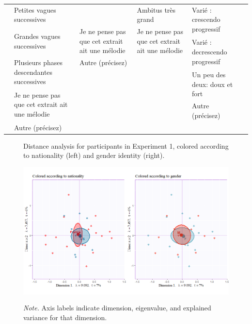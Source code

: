\documentclass[
]{article}
\newenvironment{lltable}{\begin{landscape}\begin{center}\begin{ThreePartTable}}{\end{ThreePartTable}\end{center}\end{landscape}}
\begin{document}
\begin{lltable}
\begin{footnotesize}
\begin{longtable}{p{}p{}p{}p{}p{}p{}}
  & Petites vagues successives &  & Ambitus très grand & \multirow{2}{0.2\textwidth}{Varié : crescendo progressif} &\\
  & \multirow{2}{0.2\textwidth}{Grandes vagues successives} & \multirow{2}{0.2\textwidth}{Je ne pense pas que cet extrait ait une mélodie} & \multirow{2}{0.2\textwidth}{Je ne pense pas que cet extrait ait une mélodie} & &\\
  &   & & & \multirow{2}{0.2\textwidth}{Varié : decrescendo progressif}  & \\
  & \multirow{2}{0.2\textwidth}{Plusieurs phases descendantes successives} & Autre (précisez) & &  &\\
  & & & & \multirow{2}{0.2\textwidth}{Un peu des deux: doux et fort} & \\
  & \multirow{2}{0.2\textwidth}{Je ne pense pas que cet extrait ait une mélodie} & & &  & \\
  &  & & & Autre (précisez) & \\
  & Autre (précisez) & & &  & \\
  
\cmidrule[.75pt]{2-5}
\end{longtable}
\end{footnotesize}
\end{lltable}

\begin{figure}[H]   
  \centering  
  \caption{Distance analysis for participants in Experiment 1, colored according to nationality (left) and gender identity (right).}
    \includegraphics{./supmatsimgs/qrvplot.png}
  \label{fig:qrvplot}
  \caption*{\footnotesize \textit{Note.} Axis labels indicate dimension, eigenvalue, and explained variance for that dimension.}
\end{figure}
\end{document}
